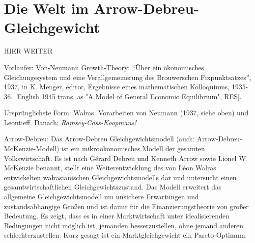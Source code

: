 \section{Die Welt im Arrow-Debreu-Gleichgewicht}
\label{Arrow-Debreu}

HIER WEITER

Vorläufer: Von-Neumann Growth-Theory: 
"`Über ein ökonomisches Gleichungssystem und eine Verallgemeinerung des Brouwerschen Fixpunktsatzes"',  1937, in K. Menger, editor, Ergebnisse eines mathematischen Kolloquiums, 1935-36. [English 1945 trans. as "A Model of General Economic Equilibrium", RES].




Ursprünglichste Form: Walras.
Vorarbeiten von Neumann (1937, siehe oben) und Leontieff. Danach: \textit{Ramsey-Cass-Koopmans!}

Arrow-Debreu:
Das Arrow-Debreu Gleichgewichtsmodell (auch: Arrow-Debreu-McKenzie-Modell) ist ein mikroökonomisches Modell der gesamten Volkswirtschaft. Es ist nach Gérard Debreu und Kenneth Arrow sowie Lionel W. McKenzie benannt, stellt eine Weiterentwicklung des von Léon Walras entwickelten walrasianischen Gleichgewichtsmodells dar und untersucht einen gesamtwirtschaftlichen Gleichgewichtszustand. 
Das Modell erweitert das allgemeine Gleichgewichtsmodell um unsichere Erwartungen und zustandsabhängige Größen und ist damit für die Finanzierungstheorie von großer Bedeutung. Es zeigt, dass es in einer Marktwirtschaft unter idealisierenden Bedingungen nicht möglich ist, jemanden besserzustellen, ohne jemand anderen schlechterzustellen. Kurz gesagt ist ein Marktgleichgewicht ein Pareto-Optimum. 















